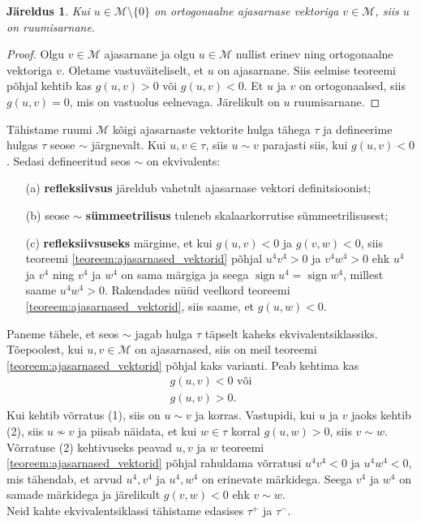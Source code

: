 \documentclass[a4paper,12pt]{article}
\theoremstyle{plain}
\newtheorem{jareldus}{Järeldus}[section]
\theoremstyle{definition}
\numberwithin{equation}{section}
\DeclareMathOperator{\sign}{sign}
\begin{document}
\begin{jareldus}
Kui $u \in \mathcal{M} \setminus \{0\}$ on ortogonaalne ajasarnase vektoriga $v \in \mathcal{M}$, siis $u$ on ruumisarnane.
\end{jareldus}
\begin{proof}
Olgu $v \in \mathcal{M}$ ajasarnane ja olgu $u \in \mathcal{M}$ nullist erinev ning ortogonaalne vektoriga $v$. Oletame vastuväiteliselt, et $u$ on ajasarnane. Siis eelmise teoreemi põhjal kehtib kas $g\left(u,v\right) > 0$ või $g\left(u,v\right) < 0$. Et $u$ ja $v$ on ortogonaalsed, siis $g\left(u,v\right) = 0$, mis on vastuolus eelnevaga. Järelikult on $u$ ruumisarnane.
\end{proof}

Tähistame ruumi $\mathcal{M}$ kõigi ajasarnaste vektorite hulga tähega $\tau$ ja defineerime hulgas $\tau$ seose $\sim$ järgnevalt. Kui $u,v \in \tau$, siis $u \sim v$ parajasti siis, kui $g\left(u,v\right) < 0$. Sedasi defineeritud seos $\sim$ on ekvivalents:
\begin{itemize}
\item[(a)] \textbf{refleksiivsus} järeldub vahetult ajasarnase vektori definitsioonist;
\item[(b)] seose $\sim$ \textbf{sümmeetrilisus} tuleneb skalaarkorrutise sümmeetrilisusest;
\item[(c)] \textbf{refleksiivsuseks} märgime, et kui $g\left(u,v\right) < 0$ ja $g\left(v, w\right) < 0$, siis teoreemi \ref{teoreem:ajasarnased_vektorid} põhjal $u^4 v^4 > 0$ ja $v^4 w^4 > 0$ ehk $u^4$ ja $v^4$ ning $v^4$ ja $w^4$ on sama märgiga ja seega $\sign u^4 = \sign w^4$, millest saame $u^4 w^4 > 0$. Rakendades nüüd veelkord teoreemi \ref{teoreem:ajasarnased_vektorid}, siis saame, et $g\left(u, w\right) < 0$.
\end{itemize}
Paneme tähele, et seos $\sim$ jagab hulga $\tau$ täpselt kaheks ekvivalentsiklassiks. Tõe\-poolest,
kui $u, v \in \mathcal{M}$ on ajasarnased, siis on meil teoreemi \ref{teoreem:ajasarnased_vektorid} põhjal kaks varianti. Peab kehtima kas 
\begin{align}
g\left(u,v\right) < 0 \text{ või} \tag{1} \\
g\left(u,v\right) > 0. \tag{2}
\end{align}
Kui kehtib võrratus (1), siis on $u \sim v$ ja korras. Vastupidi, kui $u$ ja $v$ jaoks kehtib (2), siis $u \nsim v$ ja piisab näidata, et kui $w \in \tau$ korral $g\left(u,w\right) > 0$, siis $v \sim w$. Võrratuse (2) kehtivuseks peavad $u, v$ ja $w$ teoreemi \ref{teoreem:ajasarnased_vektorid} põhjal rahuldama võrratusi $u^4 v^4 < 0$ ja $u^4 w^4 < 0$, mis tähendab, et arvud $u^4, v^4$ ja $u^4, w^4$ on erinevate märkidega. Seega $v^4$ ja $w^4$ on samade märkidega ja järelikult $g\left(v,w\right) < 0$ ehk $v \sim w$. \\
Neid kahte ekvivalentsiklassi tähistame edasises $\tau^+$ ja $\tau^-$.
\end{document}
